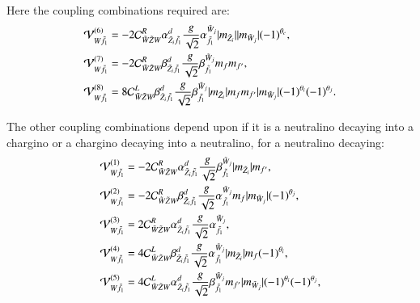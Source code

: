\documentclass[final,3p,times]{elsarticle}
\begin{document}
Here the coupling combinations required are:
\begin{align}
\mathcal{V}_{W \tilde{f}_1}^{(6)} &= -2 \mathcal{C}_{\tilde{W} \tilde{Z} W}^R \alpha_{\tilde{Z}_i \tilde{f}_1}^{d} {g \over \sqrt{2}} \alpha_{\tilde{f}_1}^{\tilde{W}_j}|m_{\tilde{Z}_i}||m_{\tilde{W}_j}|(-1)^{\theta_c}, \\
\mathcal{V}_{W \tilde{f}_1}^{(7)} &= -2 \mathcal{C}_{\tilde{W} \tilde{Z} W}^R \beta_{\tilde{Z}_i \tilde{f}_1}^{d} {g \over \sqrt{2}} \beta_{\tilde{f}_1}^{\tilde{W}_j}m_{f}m_{f'}, \\
\mathcal{V}_{W \tilde{f}_1}^{(8)} &= 8 \mathcal{C}_{\tilde{W} \tilde{Z} W}^L \beta_{\tilde{Z}_i \tilde{f}_1}^{d} {g \over \sqrt{2}} \beta_{\tilde{f}_1}^{\tilde{W}_j} |m_{\tilde{Z}_i}|m_{f} m_{f'}|m_{\tilde{W}_j}|(-1)^{\theta_i}(-1)^{\theta_j}.
\end{align}

The other coupling combinations depend upon if it is a neutralino decaying into a chargino or a chargino decaying into a neutralino, for a neutralino decaying:
\begin{align}
\mathcal{V}_{W \tilde{f}_1}^{(1)} &= -2 \mathcal{C}_{\tilde{W} \tilde{Z} W}^R \alpha_{\tilde{Z}_i \tilde{f}_1}^{d} {g \over \sqrt{2}} \beta_{\tilde{f}_1}^{\tilde{W}_j}|m_{\tilde{Z}_i}| m_{f'}, \\
\mathcal{V}_{W \tilde{f}_1}^{(2)} &= -2 \mathcal{C}_{\tilde{W} \tilde{Z} W}^R \beta_{\tilde{Z}_i \tilde{f}_1}^{d} {g \over \sqrt{2}} \alpha_{\tilde{f}_1}^{\tilde{W}_j} m_{f} |m_{\tilde{W}_j}|(-1)^{\theta_j}, \\
\mathcal{V}_{W \tilde{f}_1}^{(3)} &= 2 \mathcal{C}_{\tilde{W} \tilde{Z} W}^R \alpha_{\tilde{Z}_i \tilde{f}_1}^{d} {g \over \sqrt{2}} \alpha_{\tilde{f}_1}^{\tilde{W}_j}, \\
\mathcal{V}_{W \tilde{f}_1}^{(4)} &= 4 \mathcal{C}_{\tilde{W} \tilde{Z} W}^L \beta_{\tilde{Z}_i \tilde{f}_1}^{d} {g \over \sqrt{2}} \alpha_{\tilde{f}_1}^{\tilde{W}_j}|m_{\tilde{Z}_i}|m_{f}(-1)^{\theta_i}, \\
\mathcal{V}_{W \tilde{f}_1}^{(5)} &= 4 \mathcal{C}_{\tilde{W} \tilde{Z} W}^L \alpha_{\tilde{Z}_i \tilde{f}_1}^{d} {g \over \sqrt{2}} \beta_{\tilde{f}_1}^{\tilde{W}_j} m_{f'}|m_{\tilde{W}_j}|(-1)^{\theta_i}(-1)^{\theta_j},
\end{align}
\end{document}

